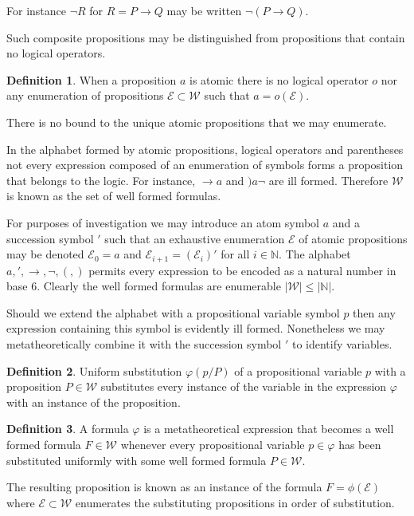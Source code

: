 \documentclass{amsbook}
\newcommand{\then}{\mathrel\rightarrow}
\newcommand{\wffs}{\mathcal W}
\theoremstyle{definition}
\newtheorem{dfn}{Definition}[section]
\begin{document}
For instance $\neg R$ for $R = P \then Q$ may be written $\neg(P \then Q)$.

Such composite propositions may be distinguished from propositions that contain no logical operators.

\begin{dfn}
    When a proposition $a$ is atomic there is no logical operator $o$ nor any enumeration of propositions $\mathcal E \subset \wffs$ such that $a = o(\mathcal E)$.
\end{dfn}

There is no bound to the unique atomic propositions that we may enumerate.

In the alphabet formed by atomic propositions, logical operators and parentheses not every expression composed of an enumeration of symbols forms a proposition that belongs to the logic. For instance, $\then a$ and $)a \neg$ are ill formed. Therefore $\mathcal W$ is known as the set of well formed formulas.

For purposes of investigation we may introduce an atom symbol $a$ and a succession symbol $'$ such that an exhaustive enumeration $\mathcal E$ of atomic propositions may be denoted $\mathcal E_0 = a$ and $\mathcal E_{i+1} = (\mathcal E_i)'$ for all $i \in \mathbb N$. The alphabet $a, ', \then, \neg, (, )$ permits every expression to be encoded as a natural number in base $6$. Clearly the well formed formulas are enumerable $|\wffs| \leq |\mathbb N|$.

Should we extend the alphabet with a propositional variable symbol $p$ then any expression containing this symbol is evidently ill formed. Nonetheless we may metatheoretically combine it with the succession symbol $'$ to identify variables.

\begin{dfn}
    Uniform substitution $\varphi(p / P)$ of a propositional variable $p$ with a proposition $P \in \wffs$ substitutes every instance of the variable in the expression $\varphi$ with an instance of the proposition.
\end{dfn}

\begin{dfn}
    A formula $\varphi$ is a metatheoretical expression that becomes a well formed formula $F \in \wffs$ whenever every propositional variable $p \in \varphi$ has been substituted uniformly with some well formed formula $P \in \wffs$.

    The resulting proposition is known as an instance of the formula $F = \phi(\mathcal E)$ where $\mathcal E \subset \wffs$ enumerates the substituting propositions in order of substitution.
\end{dfn}
\end{document}
